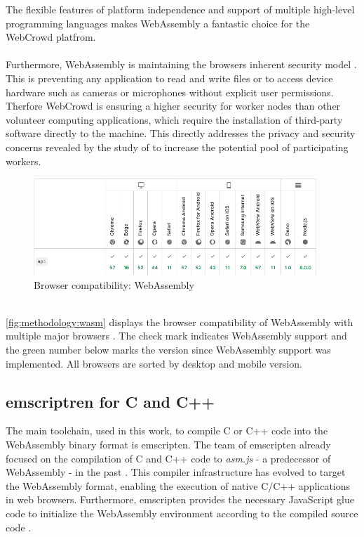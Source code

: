 The flexible features of platform independence and support of multiple high-level programming languages makes WebAssembly a fantastic choice for the WebCrowd platfrom.
\\~\\
Furthermore, WebAssembly is maintaining the browsers inherent security model \cite{methodology:wasmW3C, methodology:wasm2, methodology:wasmdocu}. This is preventing any application to read and write ﬁles or to access device hardware such as cameras or microphones without explicit user permissions. Therfore WebCrowd is ensuring a higher security for worker nodes than other volunteer computing applications, which require the installation of third-party software directly to the machine. This directly addresses the privacy and security concerns revealed by the study of \citeauthor{intro:volunteerStudy} \cite{intro:volunteerStudy} to increase the potential pool of participating workers.
\clearpage
\begin{figure}[htbp]
  \centering
  \includegraphics[width=0.95\textwidth]{gfx/figures/webassembly-browsercompability.png}
  \caption{Browser compatibility: WebAssembly \cite{methodology:wasmdocu}}
  \label{fig:methodology:wasm}
\end{figure}
~\\
\autoref{fig:methodology:wasm} displays the browser compatibility of WebAssembly with multiple major browsers \cite{methodology:wasmdocu}. The check mark indicates WebAssembly support and the green number below marks the version since WebAssembly support was implemented. All browsers are sorted by desktop and mobile version. 

\subsection{emscriptren for C and C++}
\label{subsec:methodology:wasm:cpp}
The main toolchain, used in this work, to compile C or C++ code into the WebAssembly binary format is emscripten. The team of emscripten already focused on the compilation of C and C++ code to \emph{asm.js} - a predecessor of WebAssembly - in the past \cite{methodology:emcc}. This compiler infrastructure has evolved to target the WebAssembly format, enabling the execution of native C/C++ applications in web browsers. Furthermore, emscripten provides the necessary JavaScript glue code to initialize the WebAssembly environment according to the compiled source code \cite{methodology:emcc}.

